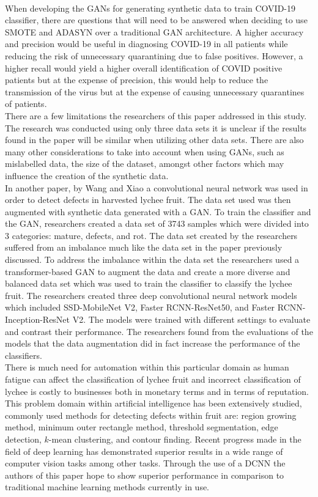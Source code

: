 \\
When developing the GANs for generating synthetic data to train COVID-19 classifier, there are questions that will need to  be answered when deciding to use SMOTE and ADASYN over a traditional GAN architecture.  A higher accuracy and precision would be useful in diagnosing COVID-19 in all patients while reducing the risk of unnecessary quarantining due to false positives.  However, a higher recall would yield a higher overall identification of COVID positive patients but at the expense of precision, this would help to reduce the transmission of the virus but at the expense of causing unnecessary quarantines of patients.
 \\
There are a few limitations the researchers of this paper addressed in this study.  The research was conducted using only three data sets it is unclear if the results found in the paper will be similar when utilizing other data sets.  There are also many other considerations to take into account when using GANs, such as mislabelled data, the size of the dataset, amongst other factors which may influence the creation of the synthetic data.
\\
In another paper, by Wang and Xiao\cite{litReviewLychee} a convolutional neural network was used in order to detect defects in harvested lychee fruit.  The data set used was then augmented with synthetic data generated with a GAN.  To train the classifier and the GAN, researchers created a data set of 3743 samples which were divided into 3 categories: mature, defects, and rot.  The data set created by the researchers suffered from an imbalance much like the data set in the paper previously discussed\cite{litReviewGanDataAugmentation}.  To address the imbalance within the data set the researchers used a transformer-based GAN to augment the data and create a more diverse and balanced data set which was used to train the classifier to classify the lychee fruit.  The researchers created three deep convolutional neural network models which included SSD-MobileNet V2, Faster RCNN-ResNet50, and Faster RCNN-Inception-ResNet V2.  The models were trained with different settings to evaluate and contrast their performance.  The researchers found from the evaluations of the models that the data augmentation did in fact increase the performance of the classifiers.
\\
There is much need for automation within this particular domain as human fatigue can affect the classification of lychee fruit and incorrect classification of lychee is costly to businesses both in monetary terms and in terms of reputation.  This problem domain within artificial intelligence has been extensively studied, commonly used methods for detecting defects within fruit are: region growing method, minimum outer rectangle method, threshold segmentation, edge detection, $k$-mean clustering, and contour finding\cite{litReviewLychee}.  Recent progress made in the field of deep learning has demonstrated superior results in a wide range of computer vision tasks among other tasks.  Through the use of a DCNN the authors of this paper \cite{litReviewLychee} hope to show superior performance in comparison to traditional machine learning methods currently in use.
